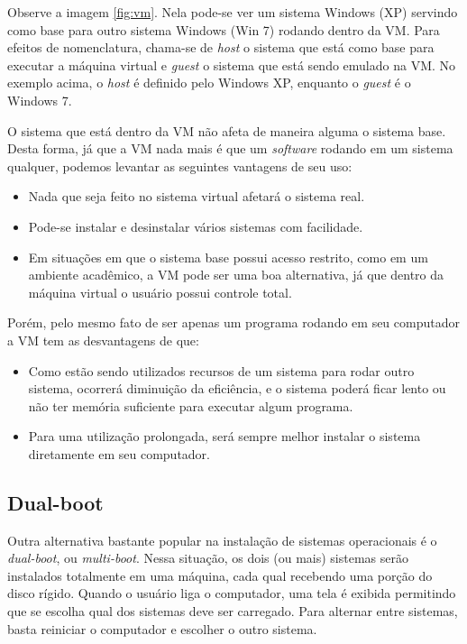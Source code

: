 \documentclass{handout_utfpr}
\begin{document}
Observe a imagem \ref{fig:vm}. Nela pode-se ver um sistema Windows (XP) servindo como base para outro sistema Windows (Win 7) rodando dentro da VM. Para efeitos de nomenclatura, chama-se de \textit{host} o sistema que está como base para executar a máquina virtual e \textit{guest} o sistema que está sendo emulado na VM. No exemplo acima, o \textit{host} é definido pelo Windows XP, enquanto o \textit{guest} é o Windows 7.

O sistema que está dentro da VM não afeta de maneira alguma o sistema base. Desta forma, já que a VM nada mais é que um \textit{software} rodando em um sistema qualquer, podemos levantar as seguintes vantagens de seu uso:

\begin{itemize}
\item Nada que seja feito no sistema virtual afetará o sistema real.
\item Pode-se instalar e desinstalar vários sistemas com facilidade.
\item Em situações em que o sistema base possui acesso restrito, como em um ambiente acadêmico, a VM pode ser uma boa alternativa, já que dentro da máquina virtual o usuário possui controle total.
\end{itemize}

Porém, pelo mesmo fato de ser apenas um programa rodando em seu computador a VM tem as desvantagens de que:

\begin{itemize}
\item Como estão sendo utilizados recursos de um sistema para rodar outro sistema, ocorrerá diminuição da eficiência, e o sistema poderá ficar lento ou não ter memória suficiente para executar algum programa.
  \item Para uma utilização prolongada, será sempre melhor instalar o sistema diretamente em seu computador.
\end{itemize}

\subsection{Dual-boot}
Outra alternativa bastante popular na instalação de sistemas operacionais é o \textit{dual-boot}, ou \textit{multi-boot}. Nessa situação, os dois (ou mais) sistemas serão instalados totalmente em uma máquina, cada qual recebendo uma porção do disco rígido. Quando o usuário liga o computador, uma tela é exibida permitindo que se escolha qual dos sistemas deve ser carregado. Para alternar entre sistemas, basta reiniciar o computador e escolher o outro sistema.
\end{document}
